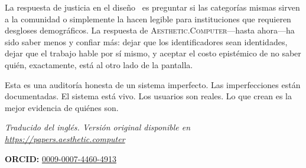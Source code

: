 \documentclass[10pt,letterpaper,twocolumn]{article}
\newcommand{\ac}{\textsc{Aesthetic.Computer}}
\begin{document}
La respuesta de justicia en el diseño~\citep{costanzachock2020design} es preguntar si las categorías mismas sirven a la comunidad o simplemente la hacen legible para instituciones que requieren desgloses demográficos. La respuesta de \ac{}---hasta ahora---ha sido saber menos y confiar más: dejar que los identificadores sean identidades, dejar que el trabajo hable por sí mismo, y aceptar el costo epistémico de no saber quién, exactamente, está al otro lado de la pantalla.

Esta es una auditoría honesta de un sistema imperfecto. Las imperfecciones están documentadas. El sistema está vivo. Los usuarios son reales. Lo que crean es la mejor evidencia de quiénes son.

\vspace{0.5em}
\noindent\textit{Traducido del inglés. Versión original disponible en \url{https://papers.aesthetic.computer}}

\vspace{0.5em}
\noindent\textbf{ORCID:} \href{https://orcid.org/0009-0007-4460-4913}{0009-0007-4460-4913}



\end{document}
